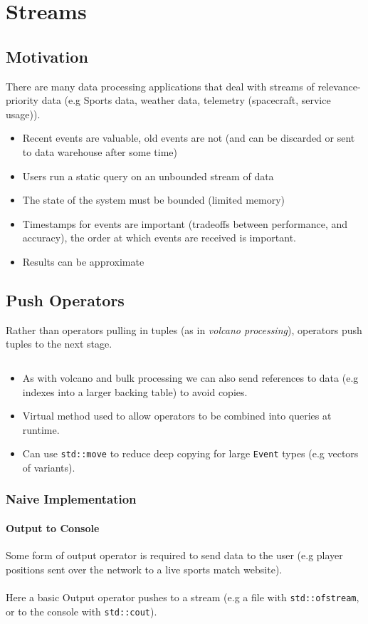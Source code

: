 \chapter{Streams}

\section{Motivation}
There are many data processing applications that deal with streams of relevance-priority data (e.g Sports data, weather data, telemetry (spacecraft, service usage)).
\begin{itemize}
    \item Recent events are valuable, old events are not (and can be discarded or sent to data warehouse after some time)
    \item Users run a static query on an unbounded stream of data
    \item The state of the system must be bounded (limited memory)
    \item Timestamps for events are important (tradeoffs between performance, and accuracy), the order at which events are received is important.
    \item Results can be approximate
\end{itemize}

\section{Push Operators}
Rather than operators pulling in tuples (as in \textit{volcano processing}), operators push tuples to the next stage.
\inputminted[firstline=10, lastline=14]{cpp}{streams/code/streams/streams.h}
\begin{itemize}
    \item As with volcano and bulk processing we can also send references to data (e.g indexes into a larger backing table) to avoid copies.
    \item Virtual method used to allow operators to be combined into queries at runtime.
    \item Can use \texttt{std::move} to reduce deep copying for large \texttt{Event} types (e.g vectors of variants).
\end{itemize}

\subsection{Naive Implementation}
\subsubsection{Output to Console}
Some form of output operator is required to send data to the user (e.g player positions sent over the network to a live sports match website).
\\
\\ Here a basic Output operator pushes to a stream (e.g a file with \texttt{std::ofstream}, or to the console with \texttt{std::cout}).
\inputminted{cpp}{streams/code/streams/operators/output.h}

